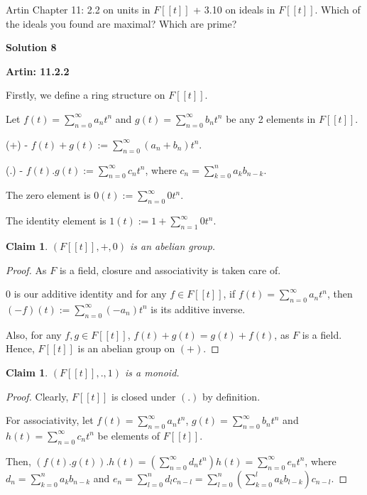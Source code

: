 \documentclass[12pt,a4paper]{article}
\newtheorem{claim}[theorem]{Claim}
\theoremstyle{definition}
\begin{document}
\begin{flushleft}
\medskip

Artin Chapter 11: 2.2 on units in $F[[t]]$ +  3.10 on ideals in $F[[t]]$. Which of the ideals you found are maximal? Which are prime?

\bigskip

{\bf Solution 8}

\medskip

{\bf Artin: 11.2.2}

Firstly, we define a ring structure on $F[[t]]$. 

Let $f(t) = \sum_{n=0}^{\infty} a_n t^n $ and $g(t) = \sum_{n=0}^{\infty} b_n t^n$ be any 2 elements in $F[[t]]$.

(+) - $f(t) + g(t) := \sum_{n=0}^{\infty} (a_n + b_n) t^n$.

(.) - $f(t).g(t) := \sum_{n=0}^{\infty} c_n t^n$, where $c_n = \sum_{k = 0}^{n} a_kb_{n-k}$.

The zero element is $0(t) := \sum_{n=0}^{\infty} 0t^n$.

The identity element is $1(t) := 1 + \sum_{n=1}^{\infty} 0t^n$.

\medskip

\begin{claim}
	$(F[[t]],+,0)$ is an abelian group.
\end{claim}

\begin{proof}
	As $F$ is a field, closure and associativity is taken care of. 

	$0$ is our additive identity and for any $f \in F[[t]]$, if $f(t) = \sum_{n=0}^{\infty} a_nt^n$, then  $(-f)(t) := \sum_{n=0}^{\infty} (-a_n)t^n$ is its additive inverse. 

	Also, for any $f,g \in F[[t]] $, $f(t) + g(t) = g(t) + f(t)$, as $F$ is a field. Hence, $F[[t]]$ is an abelian group on $(+)$.
\end{proof}




\begin{claim}
	$(F[[t]],.,1)$ is a monoid.
\end{claim}

\begin{proof}
	Clearly, $F[[t]]$ is closed under $(.)$ by definition.

	\medskip

	For associativity, let $f(t) = \sum_{n=0}^{\infty} a_nt^n$, $g(t) = \sum_{n=0}^{\infty} b_nt^n$ and $h(t) = \sum_{n=0}^{\infty} c_nt^n$ be elements of $F[[t]]$. 

	Then, $(f(t).g(t)).h(t) = (\sum_{n=0}^{\infty} d_nt^n) h(t) = \sum_{n=0}^{\infty} e_nt^n$, where $d_n = \sum_{k=0}^{n} a_kb_{n-k}$ and $e_n = \sum_{l=0}^{n} d_lc_{n-l} = \sum_{l=0}^{n}(\sum_{k=0}^{l} a_kb_{l-k})c_{n-l}$.


\end{proof}
\end{flushleft}
\end{document}
